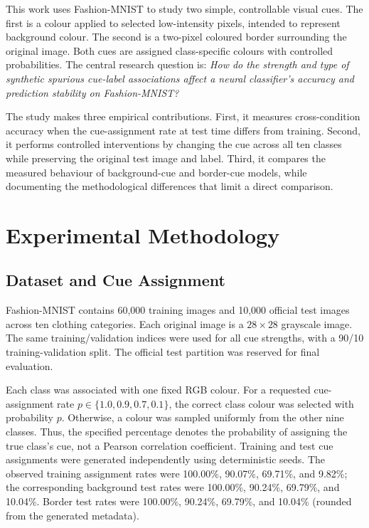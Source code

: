 \documentclass[conference]{IEEEtran}
\begin{document}
This work uses Fashion-MNIST to study two simple, controllable visual cues. The first is a colour applied to selected low-intensity pixels, intended to represent background colour. The second is a two-pixel coloured border surrounding the original image. Both cues are assigned class-specific colours with controlled probabilities. The central research question is: \emph{How do the strength and type of synthetic spurious cue-label associations affect a neural classifier's accuracy and prediction stability on Fashion-MNIST?}

The study makes three empirical contributions. First, it measures cross-condition accuracy when the cue-assignment rate at test time differs from training. Second, it performs controlled interventions by changing the cue across all ten classes while preserving the original test image and label. Third, it compares the measured behaviour of background-cue and border-cue models, while documenting the methodological differences that limit a direct comparison.

\section{Experimental Methodology}

\subsection{Dataset and Cue Assignment}
Fashion-MNIST contains 60,000 training images and 10,000 official test images across ten clothing categories. Each original image is a $28\times28$ grayscale image. The same training/validation indices were used for all cue strengths, with a 90/10 training-validation split. The official test partition was reserved for final evaluation.

Each class was associated with one fixed RGB colour. For a requested cue-assignment rate $p\in\{1.0,0.9,0.7,0.1\}$, the correct class colour was selected with probability $p$. Otherwise, a colour was sampled uniformly from the other nine classes. Thus, the specified percentage denotes the probability of assigning the true class's cue, not a Pearson correlation coefficient. Training and test cue assignments were generated independently using deterministic seeds. The observed training assignment rates were 100.00\%, 90.07\%, 69.71\%, and 9.82\%; the corresponding background test rates were 100.00\%, 90.24\%, 69.79\%, and 10.04\%. Border test rates were 100.00\%, 90.24\%, 69.79\%, and 10.04\% (rounded from the generated metadata).
\end{document}
